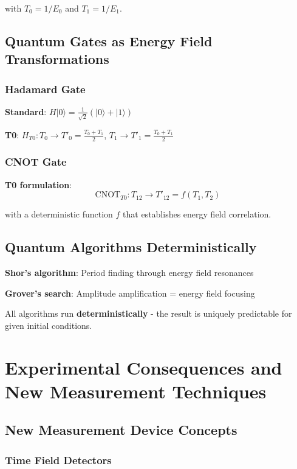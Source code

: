 \documentclass[12pt,a4paper]{article}
\newcommand{\psiket}[1]{|#1\rangle}
\begin{document}
	with $T_0 = 1/E_0$ and $T_1 = 1/E_1$.
	
	\subsection{Quantum Gates as Energy Field Transformations}
	
	\subsubsection{Hadamard Gate}
	
	\textbf{Standard}: $H\psiket{0} = \frac{1}{\sqrt{2}}(\psiket{0} + \psiket{1})$
	
	\textbf{T0}: $H_{T0}: T_0 \to T'_0 = \frac{T_0 + T_1}{2}$, $T_1 \to T'_1 = \frac{T_0 + T_1}{2}$
	
	\subsubsection{CNOT Gate}
	
	\textbf{T0 formulation}:
	\begin{equation}
		\text{CNOT}_{T0}: T_{12} \to T'_{12} = f(T_1, T_2)
	\end{equation}
	
	with a deterministic function $f$ that establishes energy field correlation.
	
	\subsection{Quantum Algorithms Deterministically}
	
	\textbf{Shor's algorithm}: Period finding through energy field resonances
	
	\textbf{Grover's search}: Amplitude amplification = energy field focusing
	
	All algorithms run \textbf{deterministically} - the result is uniquely predictable for given initial conditions.
	
	\section{Experimental Consequences and New Measurement Techniques}
	
	\subsection{New Measurement Device Concepts}
	
	\subsubsection{Time Field Detectors}
	
\end{document}
